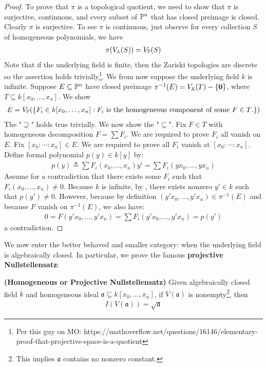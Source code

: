 \documentclass{report}
\begin{document}
\begin{proof}
To prove that $\pi $ is a topological quotient, we need to show that $\pi $ is surjective, continuous, and every subset of $\P^n$ that has closed preimage is closed. Clearly $\pi $ is surjective. To see $\pi $ is continuous, just observe for every collection $S$ of homogeneous polynomials, we have 
\begin{align}
\label{pvs}
\pi (V_{\A}(S))= V_{\P}(S)
\end{align}
Note that if the underlying field is finite, then the Zariski topologies are discrete so the assertion holds trivially\footnote{Per this guy on MO: https://mathoverflow.net/questions/16146/elementary-proof-that-projective-space-is-a-quotient}. We from now suppose the underlying field $k$ is infinite. Suppose $E\subseteq \P^n$ have closed preimage $\pi ^{-1}(E)=V_\A(T)- \set{\textbf{0}}$, where $T \subseteq k[x_0,\dots ,x_n]$. We show 
\begin{align*}
E= V_\P(\set{F_i \in k[x_0,\dots ,x_n]: F_i\text{ is the homogeneous component of some $F \in T$.}})
\end{align*}
The "$\supseteq$" holds true trivially. We now show the "$\subseteq$". Fix $F \in T$ with homogeneous decomposition $F= \sum F_i$. We are required to prove $F_i$ all vanish on  $E$. Fix $[x_0:\cdots :x_n] \in E$. We are required to prove all $F_i$ vanish at  $[x_0:\cdots :x_n]$. Define formal polynomial $p(y) \in  k[y]$ by: 
\begin{align*}
  p(y)\triangleq \sum F_i(x_0,\dots, x_n)y^i= \sum F_i (yx_0,\dots ,yx_n)
\end{align*}
Assume for a contradiction that there exists some  $F_i$ such that $F_i (x_0,\dots ,x_n)\neq 0$. Because $k$ is infinite, by , there exists nonzero $y' \in k$ such that $p(y')\neq 0$. However, because by definition $(y'x_0,\dots ,y'x_n)  \in \pi ^{-1}(E)$ and because $F$ vanish on  $\pi ^{-1}(E)$, we also have: 
\begin{align*}
 0= F(y'x_0,\dots ,y'x_n)= \sum F_i(y'x_0,\dots ,y'x_n)= p(y')
\end{align*}
a contradiction.
\end{proof}
We now enter the better behaved and smaller category: when the underlying field is algebraically closed. In particular, we prove the famous \textbf{projective Nullstellensatz}: 
\begin{theorem}
\textbf{(Homogeneous or Projective Nullstellensatz)} Given algebraically closed field $k$ and homogeneous ideal $\mathfrak{a} \subseteq k[x_0,\dots ,x_n]$, if $V(\mathfrak{a})$ is nonempty\footnote{This implies $\mathfrak{a}$ contains no nonzero constant.}, then 
\begin{align*}
I(V(\mathfrak{a}))=\sqrt{\mathfrak{a}} 
\end{align*}
\end{theorem}
\end{document}
